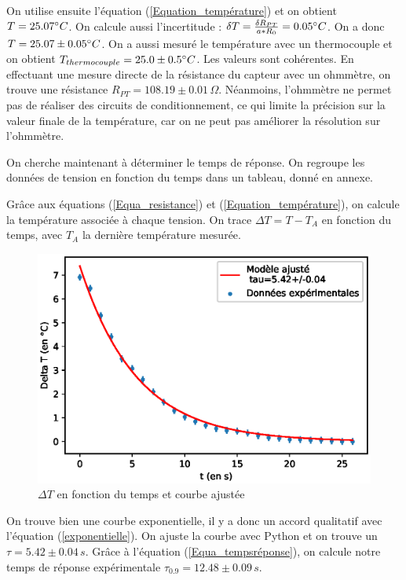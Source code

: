 \documentclass[12pt]{article}
\begin{document}
On utilise ensuite l'équation (\ref{Equation_température}) et on obtient $T=25.07 \degree C$. On calcule aussi l'incertitude : $\delta T = \frac{\delta R_{PT}}{a*R_0}=0.05 \degree C$. On a donc $T=25.07\pm 0.05 \degree C$. On a aussi mesuré le température avec un thermocouple et on obtient $T_{thermocouple}=25.0\pm 0.5 \degree C$. Les valeurs sont cohérentes. 
En effectuant une mesure directe de la résistance du capteur avec un ohmmètre, on trouve une résistance $R_{PT}=108.19\pm 0.01 \, \Omega$. Néanmoins, l'ohmmètre ne permet pas de réaliser des circuits de conditionnement, ce qui limite la précision sur la valeur finale de la température, car on ne peut pas améliorer la résolution sur l'ohmmètre. 

On cherche maintenant à déterminer le temps de réponse. On regroupe les données de tension en fonction du temps dans un tableau, donné en annexe.


Grâce aux équations (\ref{Equa_resistance}) et (\ref{Equation_température}), on calcule la température associée à chaque tension. On trace $\Delta T=T-T_A$ en fonction du temps, avec $T_A$ la dernière température mesurée.

\begin{figure}[h!]
	\begin{center}
		\includegraphics[scale=0.7]{Tempscara.eps}
		\caption{$\Delta T$ en fonction du temps et courbe ajustée}
		\label{Temps_caractéristique}
	\end{center}
\end{figure}

On trouve bien une courbe exponentielle, il y a donc un accord qualitatif avec l'équation (\ref{exponentielle}). On ajuste la courbe avec Python et on trouve un $\tau = 5.42\pm 0.04\,s$. Grâce à l'équation (\ref{Equa_tempsréponse}), on calcule notre temps de réponse expérimentale $\tau_{0.9}=12.48\pm 0.09\,s$.
\end{document}
